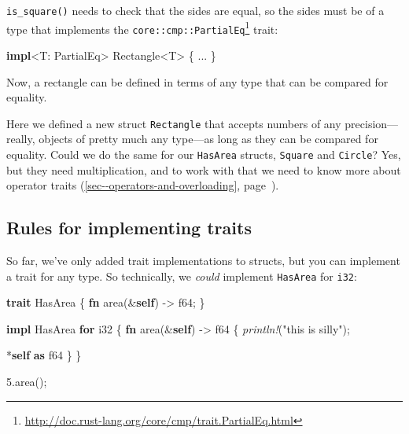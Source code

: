 \documentclass[a4paper,]{book}
\renewcommand*{\hyperlink}[2]{%
 #2 (\autoref{#1}, page~\pageref{#1})}
\newenvironment{Shaded}{\begin{snugshade}}{\end{snugshade}}
\newcommand{\KeywordTok}[1]{\textcolor[rgb]{0.13,0.29,0.53}{\textbf{{#1}}}}
\newcommand{\DataTypeTok}[1]{\textcolor[rgb]{0.13,0.29,0.53}{{#1}}}
\newcommand{\DecValTok}[1]{\textcolor[rgb]{0.00,0.00,0.81}{{#1}}}
\newcommand{\StringTok}[1]{\textcolor[rgb]{0.31,0.60,0.02}{{#1}}}
\newcommand{\BuiltInTok}[1]{{#1}}
\newcommand{\PreprocessorTok}[1]{\textcolor[rgb]{0.56,0.35,0.01}{\textit{{#1}}}}
\newcommand{\NormalTok}[1]{{#1}}
\renewcommand{\href}[2]{#2\footnote{\url{#1}}}
\begin{document}
\texttt{is\_square()} needs to check that the sides are equal, so the
sides must be of a type that implements the
\href{http://doc.rust-lang.org/core/cmp/trait.PartialEq.html}{\texttt{core::cmp::PartialEq}}
trait:

\begin{Shaded}
\begin{Highlighting}[]
\KeywordTok{impl}\NormalTok{<T: }\BuiltInTok{PartialEq}\NormalTok{> Rectangle<T> \{ ... \}}
\end{Highlighting}
\end{Shaded}

Now, a rectangle can be defined in terms of any type that can be
compared for equality.

Here we defined a new struct \texttt{Rectangle} that accepts numbers of
any precision---really, objects of pretty much any type---as long as
they can be compared for equality. Could we do the same for our
\texttt{HasArea} structs, \texttt{Square} and \texttt{Circle}? Yes, but
they need multiplication, and to work with that we need to know more
about \protect\hyperlink{sec--operators-and-overloading}{operator
traits}.

\subsection{Rules for implementing
traits}\label{rules-for-implementing-traits}

So far, we've only added trait implementations to structs, but you can
implement a trait for any type. So technically, we \emph{could}
implement \texttt{HasArea} for \texttt{i32}:

\begin{Shaded}
\begin{Highlighting}[]
\KeywordTok{trait} \NormalTok{HasArea \{}
    \KeywordTok{fn} \NormalTok{area(&}\KeywordTok{self}\NormalTok{) -> }\DataTypeTok{f64}\NormalTok{;}
\NormalTok{\}}

\KeywordTok{impl} \NormalTok{HasArea }\KeywordTok{for} \DataTypeTok{i32} \NormalTok{\{}
    \KeywordTok{fn} \NormalTok{area(&}\KeywordTok{self}\NormalTok{) -> }\DataTypeTok{f64} \NormalTok{\{}
        \PreprocessorTok{println!}\NormalTok{(}\StringTok{"this is silly"}\NormalTok{);}

        \NormalTok{*}\KeywordTok{self} \KeywordTok{as} \DataTypeTok{f64}
    \NormalTok{\}}
\NormalTok{\}}

\DecValTok{5.}\NormalTok{area();}
\end{Highlighting}
\end{Shaded}
\end{document}
